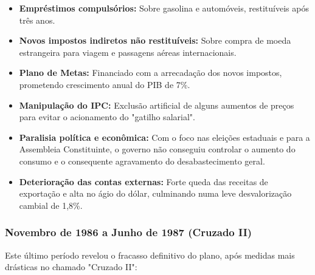 \documentclass[a4paper,12pt]{article}[abntex2]
\begin{document}
\begin{itemize}
    \item \textbf{Empréstimos compulsórios:} Sobre gasolina e automóveis, restituíveis após três anos.
    \item \textbf{Novos impostos indiretos não restituíveis:} Sobre compra de moeda estrangeira para viagem e passagens aéreas internacionais.
    \item \textbf{Plano de Metas:} Financiado com a arrecadação dos novos impostos, prometendo crescimento anual do PIB de 7\%.
    \item \textbf{Manipulação do IPC:} Exclusão artificial de alguns aumentos de preços para evitar o acionamento do "gatilho salarial".
    \item \textbf{Paralisia política e econômica:} Com o foco nas eleições estaduais e para a Assembleia Constituinte, o governo não conseguiu controlar o aumento do consumo e o consequente agravamento do desabastecimento geral.
    \item \textbf{Deterioração das contas externas:} Forte queda das receitas de exportação e alta no ágio do dólar, culminando numa leve desvalorização cambial de 1,8\%.
\end{itemize}

\subsubsection{\textbf{Novembro de 1986 a Junho de 1987 (Cruzado II)}}

Este último período revelou o fracasso definitivo do plano, após medidas mais drásticas no chamado "Cruzado II":
\end{document}
